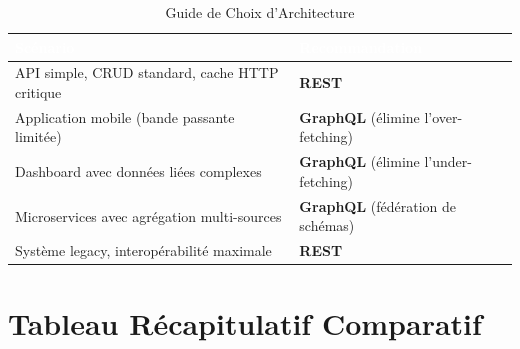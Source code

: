 \documentclass[12pt,a4paper]{article}
\begin{document}
\begin{table}[H]
\centering
{}
\begin{tabular}{@{}L{7cm}L{8cm}@{}}
\toprule
{}
\textcolor{white}{\textbf{Scénario}} & \textcolor{white}{\textbf{Recommandation}} \\
\midrule
API simple, CRUD standard, cache HTTP critique & \textbf{REST} \\
Application mobile (bande passante limitée) & \textbf{GraphQL} (élimine l'over-fetching) \\
Dashboard avec données liées complexes & \textbf{GraphQL} (élimine l'under-fetching) \\
Microservices avec agrégation multi-sources & \textbf{GraphQL} (fédération de schémas) \\
Système legacy, interopérabilité maximale & \textbf{REST} \\
\bottomrule
\end{tabular}
\caption{Guide de Choix d'Architecture}
\end{table}

\newpage

\section{Tableau Récapitulatif Comparatif}
\end{document}

